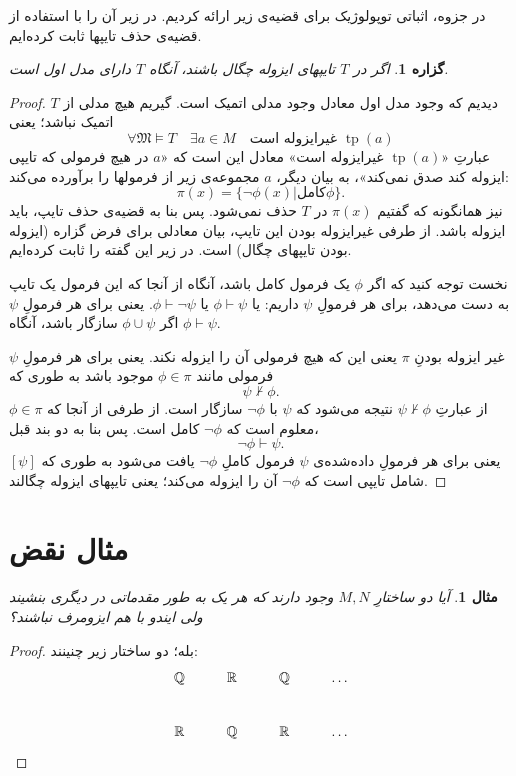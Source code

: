 \documentclass[12pt,a4paper]{report}
\theoremstyle{colorhead}
\newtheorem{mesal}[thm]{مثال}
\newtheorem{prop}[thm]{گزاره}
\DeclareMathOperator{\tp}{tp}
\begin{document}
در جزوه، اثباتی توپولوژیک برای قضیه‌ی زیر ارائه کردیم. در زیر آن را با استفاده از قضیه‌ی حذف تایپها ثابت کرده‌ایم.
\begin{prop}
اگر در
$T$
تایپهای ایزوله چگال باشند، آنگاه
$T$
دارای مدل اول است.
\end{prop}
\begin{proof}
دیدیم که وجود مدل اول معادل وجود مدلی اتمیک است. گیریم هیچ مدلی از
$T$
اتمیک نباشد؛ یعنی
\[
\forall \mathfrak{M}\models T \quad \exists a\in M \quad \text{غیرایزوله است }\tp(a)
\]
عبارتِ
«$\tp(a)$
غیرایزوله است» معادل این است که «$a$
در هیچ فرمولی که تایپی ایزوله کند صدق نمی‌کند»، به بیان دیگر،
$a$
مجموعه‌ی زیر از فرمولها را برآورده می‌کند:
\[
\pi(x)=\{\neg\phi(x)| \text{کامل}\phi\}.
\]
نیز  همانگونه که گفتیم
$\pi(x)$
در 
$T$
حذف نمی‌شود. پس بنا به قضیه‌ی حذف تایپ، باید ایزوله باشد. از طرفی غیرایزوله بودن این تایپ، بیان معادلی برای فرض گزاره (ایزوله بودن تایپهای چگال) است. در زیر این گفته را ثابت کرده‌ایم.
\par 
نخست توجه کنید که اگر
$\phi$
یک فرمول کامل باشد، آنگاه از آنجا که این فرمول یک تایپ به دست می‌دهد،
برای هر فرمولِ
$\psi$
داریم:
یا
$\phi\vdash \psi$
یا
$\phi\vdash \neg \psi$.
یعنی برای هر فرمولِ
$\psi$
اگر
$\phi\cup \psi$
سازگار باشد، آنگاه
$\phi\vdash \psi$.
\par 
غیر ایزوله بودنِ
$\pi$
یعنی این که هیچ فرمولی آن را ایزوله نکند. یعنی
برای هر فرمولِ
$\psi$
فرمولی مانند
$\phi\in \pi$
موجود باشد به طوری که
\[
\psi\not\vdash \phi.
\]
از عبارتِ
$\psi\not\vdash \phi$
نتیجه می‌شود که
$\psi$
با
$\neg \phi$
سازگار است. از طرفی از آنجا که
$\phi\in \pi$
معلوم است که
$\neg \phi$
کامل است. پس بنا به  دو بند قبل،
\[
\neg \phi\vdash \psi.
\]
یعنی برای هر فرمولِ داده‌شده‌ی
$\psi$
فرمول کاملِ
$\neg \phi$
یافت می‌شود به طوری که
$[\psi]$
شامل تایپی است که
$\neg\phi$
آن را
ایزوله می‌کند؛ یعنی تایپهای ایزوله چگالند.
\end{proof}
\pagebreak
\section*{مثال نقض}
\begin{mesal}
آیا دو ساختارِ
$M,N$
وجود دارند که هر یک به طور مقدماتی در دیگری بنشیند ولی ایندو با هم ایزومرف نباشند؟
\end{mesal}
\begin{proof}
بله؛ دو ساختار زیر چنینند:
\[
\xymatrix{
\mathbb{Q}&  \mathbb{R} & \mathbb{Q}& \ldots\\
\mathbb{R}& \mathbb{Q} &\mathbb{R}& \ldots
}
\]
\end{proof}
\end{document}
